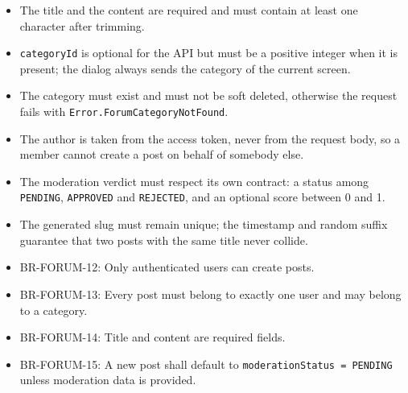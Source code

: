 \begin{itemize}[leftmargin=1.6em,topsep=3pt,itemsep=2pt,parsep=0pt,label=$\bullet$]
      \item The title and the content are required and must contain at least one character
            after trimming.
      \item \texttt{categoryId} is optional for the API but must be a positive integer when it is
            present; the dialog always sends the category of the current screen.
      \item The category must exist and must not be soft deleted, otherwise the request
            fails with \texttt{Error.ForumCategoryNotFound}.
      \item The author is taken from the access token, never from the request body, so a
            member cannot create a post on behalf of somebody else.
      \item The moderation verdict must respect its own contract: a status among
            \texttt{PENDING}, \texttt{APPROVED} and \texttt{REJECTED}, and an optional
            score between 0 and 1.
      \item The generated slug must remain unique; the timestamp and random suffix
            guarantee that two posts with the same title never collide.
\end{itemize}

\begin{itemize}[leftmargin=1.6em,topsep=3pt,itemsep=2pt,parsep=0pt,label=$\bullet$]\brrulelist
      \item BR-FORUM-12: Only authenticated users can create posts.
      \item BR-FORUM-13: Every post must belong to exactly one user and may belong to a
            category.
      \item BR-FORUM-14: Title and content are required fields.
      \item BR-FORUM-15: A new post shall default to \texttt{moderationStatus = PENDING}
            unless moderation data is provided.
\end{itemize}

